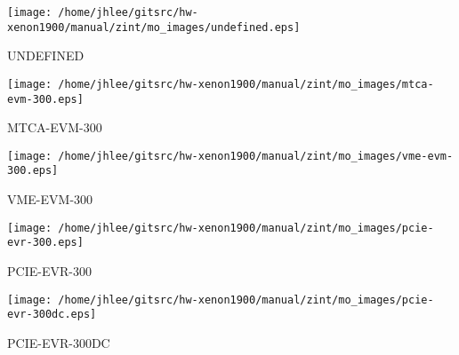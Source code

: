 \noindent
\vspace{1cm}
\begin{minipage}{.2\textwidth}
\begin{center}
\texttt{[image: /home/jhlee/gitsrc/hw-xenon1900/manual/zint/mo\_images/undefined.eps]}
\end{center}
\end{minipage}
\begin{minipage}{.7\textwidth}
UNDEFINED
\end{minipage}


\noindent
\vspace{1cm}
\begin{minipage}{.2\textwidth}
\begin{center}
\texttt{[image: /home/jhlee/gitsrc/hw-xenon1900/manual/zint/mo\_images/mtca-evm-300.eps]}
\end{center}
\end{minipage}
\begin{minipage}{.7\textwidth}
MTCA-EVM-300
\end{minipage}


\noindent
\vspace{1cm}
\begin{minipage}{.2\textwidth}
\begin{center}
\texttt{[image: /home/jhlee/gitsrc/hw-xenon1900/manual/zint/mo\_images/vme-evm-300.eps]}
\end{center}
\end{minipage}
\begin{minipage}{.7\textwidth}
VME-EVM-300
\end{minipage}


\noindent
\vspace{1cm}
\begin{minipage}{.2\textwidth}
\begin{center}
\texttt{[image: /home/jhlee/gitsrc/hw-xenon1900/manual/zint/mo\_images/pcie-evr-300.eps]}
\end{center}
\end{minipage}
\begin{minipage}{.7\textwidth}
PCIE-EVR-300
\end{minipage}


\noindent
\vspace{1cm}
\begin{minipage}{.2\textwidth}
\begin{center}
\texttt{[image: /home/jhlee/gitsrc/hw-xenon1900/manual/zint/mo\_images/pcie-evr-300dc.eps]}
\end{center}
\end{minipage}
\begin{minipage}{.7\textwidth}
PCIE-EVR-300DC
\end{minipage}



